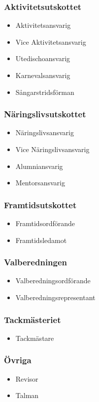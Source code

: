 \documentclass{dsekprotokoll}
\begin{document}
\begin{multicols}{2}
  \subsubsection*{Aktivitetsutskottet}
  \begin{itemize}
    \item Aktivitetsansvarig
    \item Vice Aktivitetsansvarig
    \item Utedischoansvarig
    \item Karnevalsansvarig
    \item Sångarstridsförman
  \end{itemize}
  \subsubsection*{Näringslivsutskottet}
  \begin{itemize}
    \item Näringslivsansvarig
    \item Vice Näringslivsansvarig
    \item Alumniansvarig
    \item Mentorsansvarig
  \end{itemize}
  \subsubsection*{Framtidsutskottet}
  \begin{itemize}
    \item Framtidsordförande
    \item Framtidsledamot
  \end{itemize}

  \subsubsection*{Valberedningen}
  \begin{itemize}
    \item Valberedningsordförande
    \item Valberedningsrepresentant
    \end{itemize}
 
  \subsubsection*{Tackmästeriet}
  \begin{itemize}
  \item Tackmästare
  \end{itemize}
  
  \subsubsection*{Övriga}
  \begin{itemize}
    \item Revisor
    \item Talman
  \end{itemize}

\end{multicols}
\end{document}
